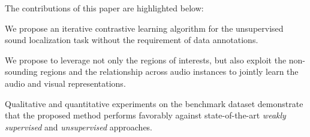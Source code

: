 The contributions of this paper are highlighted below:
\begin{compactitem}
  \item We propose an iterative contrastive learning algorithm for the unsupervised sound localization task without the requirement of data annotations. %
  \item We propose to leverage not only the regions of interests, but also exploit the non-sounding regions and the relationship across audio instances to jointly learn the audio and visual representations.
  \item Qualitative and quantitative experiments on the benchmark dataset demonstrate that the proposed method performs favorably against state-of-the-art \emph{weakly supervised} and \emph{unsupervised} approaches. %
%   
\end{compactitem}

